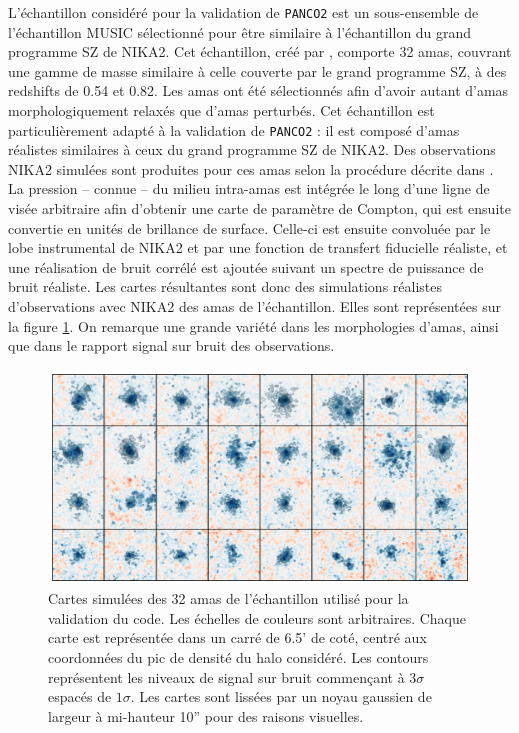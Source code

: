 L'échantillon considéré pour la validation de \texttt{PANCO2} est un sous-ensemble de l'échantillon MUSIC sélectionné pour être similaire à l'échantillon du grand programme SZ de NIKA2.
Cet échantillon, créé par , comporte 32 amas, couvrant une gamme de masse similaire à celle couverte par le grand programme SZ, à des redshifts de 0.54 et 0.82.
Les amas ont été sélectionnés afin d'avoir autant d'amas morphologiquement relaxés que d'amas perturbés.
Cet échantillon est particulièrement adapté à la validation de \texttt{PANCO2} : il est composé d'amas réalistes similaires à ceux du grand programme SZ de NIKA2.
Des observations NIKA2 simulées sont produites pour ces amas selon la procédure décrite dans \cite{ruppin_impact_2019-1}.
La pression -- connue -- du milieu intra-amas est intégrée le long d'une ligne de visée arbitraire afin d'obtenir une carte de paramètre de Compton, qui est ensuite convertie en unités de brillance de surface.
Celle-ci est ensuite convoluée par le lobe instrumental de NIKA2 et par une fonction de transfert fiducielle réaliste, et une réalisation de bruit corrélé est ajoutée suivant un spectre de puissance de bruit réaliste.
Les cartes résultantes sont donc des simulations réalistes d'observations avec NIKA2 des amas de l'échantillon.
Elles sont représentées sur la figure \ref{fig:panco:all_maps_music}.
On remarque une grande variété dans les morphologies d'amas, ainsi que dans le rapport signal sur bruit des observations.

\begin{figure}[t]
    \centering
    \includegraphics[width=\linewidth]{Figures/Chap_panco/all_maps_music.pdf}
    \caption{Cartes simulées des 32 amas de l'échantillon utilisé pour la validation du code.
        Les échelles de couleurs sont arbitraires.
        Chaque carte est représentée dans un carré de 6.5' de coté, centré aux coordonnées du pic de densité du halo considéré.
        Les contours représentent les niveaux de signal sur bruit commençant à $3\sigma$ espacés de $1\sigma$.
        Les cartes sont lissées par un noyau gaussien de largeur à mi-hauteur 10''  pour des raisons visuelles.
    }
    \label{fig:panco:all_maps_music}
\end{figure}

